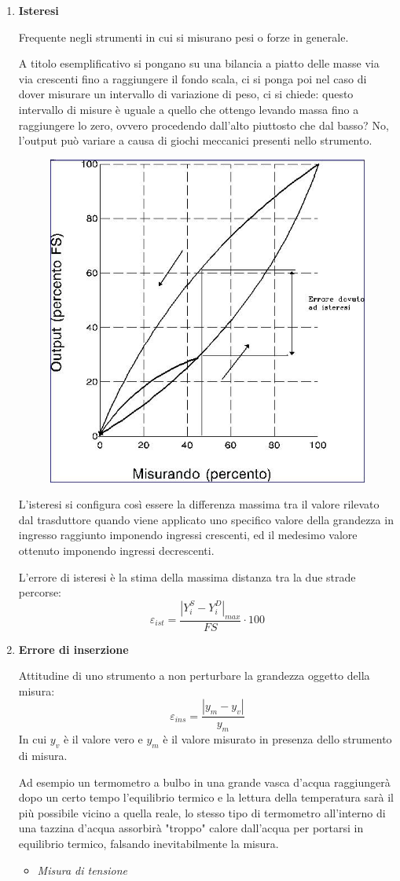 \documentclass[a4paper, 15pt]{article}
\begin{document}
\begin{adjustwidth}{2in}{}
\begin{enumerate}
\item \textbf{Isteresi} 

	Frequente negli strumenti in cui si misurano pesi o forze in generale. \newline 
	
	A titolo esemplificativo si pongano su una bilancia a piatto delle masse via via crescenti fino a raggiungere il fondo scala, ci si ponga poi nel caso di dover misurare un intervallo di variazione di peso, ci si chiede: questo intervallo di misure è uguale a quello che ottengo levando massa fino a raggiungere lo zero, ovvero procedendo dall'alto piuttosto che dal basso? No, l'output può variare a causa di giochi meccanici presenti nello strumento. 	
\begin{figure}[H]
	\centering
	\includegraphics[width=0.5\linewidth]{fig/screenshot016}
	\label{fig:screenshot016}
\end{figure}
	L'isteresi si configura così essere la differenza massima tra il valore rilevato dal trasduttore quando viene applicato uno
	specifico valore della grandezza in ingresso raggiunto imponendo ingressi crescenti,
	ed il medesimo valore ottenuto imponendo ingressi decrescenti. \newline
	
	L'errore di isteresi è la stima della massima distanza tra la due strade percorse:
	\[\varepsilon_{ist} = \dfrac{|Y^S_i - Y^D_i|_{max}}{FS}\cdot 100\]
	
\item \textbf{Errore di inserzione} 

	Attitudine di uno strumento a non perturbare la grandezza oggetto della
	misura:
	\[\varepsilon_{ins} = \dfrac{|y_m - y_v|}{y_m}\]
	In cui $y_v$ è il valore vero e $y_m$ è il valore misurato in presenza dello strumento di misura. \newline 
	
	Ad esempio un termometro a bulbo in una grande vasca d'acqua raggiungerà dopo un certo tempo l'equilibrio termico e la lettura della temperatura sarà il più possibile vicino a quella reale, lo stesso tipo di termometro all'interno di una tazzina d'acqua assorbirà "troppo" calore dall'acqua per portarsi in equilibrio termico, falsando inevitabilmente la misura.
	\begin{itemize}
		\item \textit{Misura di tensione} 
		

\end{itemize}
\end{enumerate}
\end{adjustwidth}
\end{document}
